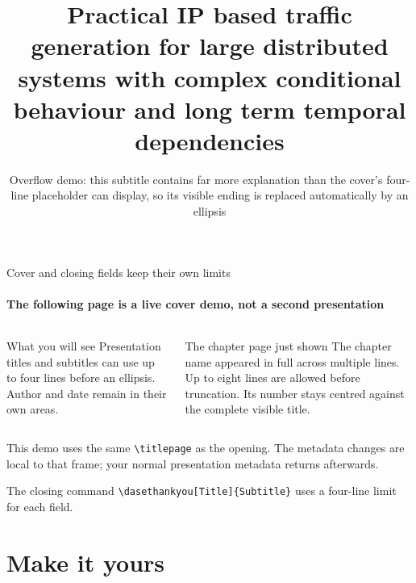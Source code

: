 \documentclass[aspectratio=169,10pt]{beamer}
\begin{document}
\begin{frame}{Cover and closing fields keep their own limits}
  \framesubtitle{The following page is a live cover demo, not a second presentation}
  \begin{columns}[T,onlytextwidth]
      \begin{block}{What you will see}
        Presentation titles and subtitles can use up to four lines before an ellipsis. Author and date remain in their own areas.
      \end{block}
      \begin{exampleblock}{The chapter page just shown}
        The chapter name appeared in full across multiple lines. Up to eight lines are allowed before truncation. Its number stays centred against the complete visible title.
      \end{exampleblock}
  \end{columns}
  \medskip
  \small This demo uses the same \texttt{\textbackslash titlepage} as the opening. The metadata changes are local to that frame; your normal presentation metadata returns afterwards.
  \par\medskip
  \textcolor{DASEslate}{\small The closing command \texttt{\textbackslash dasethankyou[Title]\{Subtitle\}} uses a four-line limit for each field.}
\end{frame}

\begin{frame}[plain]
  \begingroup
  \title{Practical IP based traffic generation for large distributed systems with complex conditional behaviour and long term temporal dependencies}
  \subtitle{Overflow demo: this subtitle contains far more explanation than the cover's four-line placeholder can display, so its visible ending is replaced automatically by an ellipsis}
  \titlepage
  \endgroup
\end{frame}

\section{Make it yours}
\end{document}
